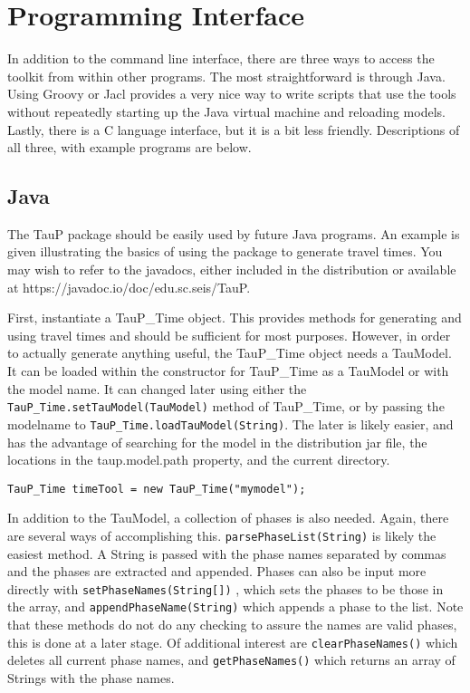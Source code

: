 
\section{Programming Interface}

In addition to the command line interface, there are three ways to access
the toolkit from within other programs. The most straightforward is
through Java. Using Groovy or Jacl provides a very nice way to write scripts that
use the tools without repeatedly starting up the Java virtual machine and
reloading models. Lastly, there is a C language interface, but it is
a bit less friendly. Descriptions of all three, with example programs
are below.

\subsection{Java}

The TauP package should be easily used by future Java programs. An
example is given illustrating the basics of using the package to
generate travel times. You may wish to refer to the javadocs, either
included in the distribution or available at
https://javadoc.io/doc/edu.sc.seis/TauP.

First, instantiate a TauP\_Time object. This provides methods for
generating and
using travel times and should be sufficient for most purposes.
However, in order to actually generate anything useful, the TauP\_Time
object needs a TauModel. It can be loaded within the constructor for TauP\_Time
as a TauModel or with the model name.
It can changed later using either the \texttt{TauP\_Time.setTauModel(TauModel)} method of
TauP\_Time, or by passing the modelname to \texttt{TauP\_Time.loadTauModel(String)}.
The later is likely easier, and has the advantage of searching for the model in
the distribution jar file, the locations in the taup.model.path property,
and the current directory.

\texttt{TauP\_Time timeTool = new TauP\_Time("mymodel");}

In addition to the TauModel, a collection of phases is also needed. Again,
there are several ways of accomplishing this.
\texttt{parsePhaseList(String)} is likely the easiest method. A String is passed
with the phase names separated by commas and the phases are extracted and
appended. Phases can also be input more
directly with \texttt{setPhaseNames(String[])} ,
which sets the phases to be those in the array, and
\texttt{appendPhaseName(String)} which appends a phase to the list. Note that
these methods do not do any checking to assure the names are valid phases,
this is done at a later stage. Of additional interest are
\texttt{clearPhaseNames()} which deletes all current phase names, and
\texttt{getPhaseNames()} which returns an array of Strings with the phase names.

